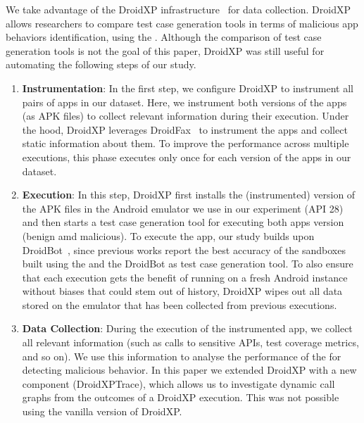 

We take advantage of the DroidXP infrastructure~\cite{DBLP:conf/scam/CostaMCMVBC20}
for data collection. DroidXP allows researchers to compare 
test case generation tools in terms of malicious app behaviors identification, using the \mas. Although the comparison of test
case generation tools is not the goal of this paper, DroidXP
was still useful for automating the following steps of our study.


\begin{enumerate}[S1]
 \item \textbf{Instrumentation}: In the first step,
we configure DroidXP to instrument all pairs of apps in our dataset.
Here, we instrument both versions of the apps (as APK files) to collect relevant information during their execution. Under the hood, DroidXP leverages
DroidFax~\cite{DBLP:conf/icsm/CaiR17a} to instrument the apps and collect static
information about them. To improve the performance across multiple executions,
this phase executes only once for each version of the apps in our dataset.

\item \textbf{Execution}: In this step, DroidXP first installs the (instrumented) version of the APK files in the Android emulator we use in our experiment (API 28) and then starts a test case generation tool for executing both apps version (benign amd malicious). To execute the app, our study builds upon DroidBot~\cite{DBLP:conf/icse/LiYGC17}, since previous works report the best accuracy of the sandboxes built using the \mas and the DroidBot as test case generation tool. To also ensure that each execution gets the benefit of running on a fresh Android instance without biases that could stem out of history, DroidXP wipes out all data stored on the emulator that has been collected from previous executions.


\item \textbf{Data Collection}: During the execution of the instrumented app, we collect all relevant information (such as calls to sensitive APIs, test coverage metrics, and so on). We use this information to analyse the performance of the \mas for detecting malicious behavior. In this paper we extended DroidXP with a new component (DroidXPTrace), which allows us to investigate dynamic call graphs from the outcomes of a DroidXP execution. This was not possible using the vanilla version of DroidXP.
\end{enumerate}

